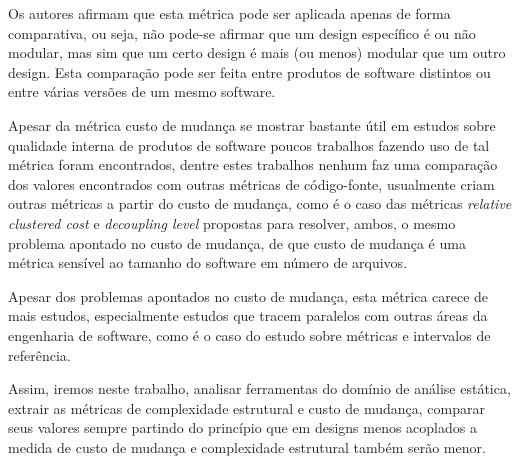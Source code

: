 Os autores afirmam que esta métrica pode ser aplicada apenas de forma
comparativa, ou seja, não pode-se afirmar que um design específico é ou não
modular, mas sim que um certo design é mais (ou menos) modular que um outro
design. Esta comparação pode ser feita entre produtos de software distintos ou
entre várias versões de um mesmo software.

Apesar da métrica custo de mudança se mostrar bastante útil em estudos sobre
qualidade interna de produtos de software poucos trabalhos fazendo uso de tal
métrica foram encontrados, dentre estes trabalhos nenhum faz uma comparação dos
valores encontrados com outras métricas de código-fonte, usualmente criam
outras métricas a partir do custo de mudança, como é o caso das métricas {\it
relative clustered cost} \cite{Milev2009} e {\it decoupling level}
\cite{Mo2016} propostas para resolver, ambos, o mesmo problema apontado no
custo de mudança, de que custo de mudança é uma métrica sensível ao tamanho do
software em número de arquivos.

Apesar dos problemas apontados no custo de mudança, esta métrica carece de mais
estudos, especialmente estudos que tracem paralelos com outras áreas da
engenharia de software, como é o caso do estudo sobre métricas e intervalos de
referência.

Assim, iremos neste trabalho, analisar ferramentas do domínio de análise
estática, extrair as métricas de complexidade estrutural e custo de mudança,
comparar seus valores sempre partindo do princípio que em designs menos
acoplados a medida de custo de mudança e complexidade estrutural também serão menor.

